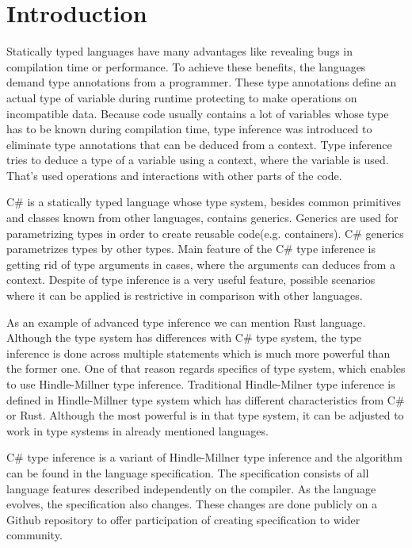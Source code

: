 \chapter*{Introduction}

Statically typed languages have many advantages like revealing bugs in compilation time or performance.
To achieve these benefits, the languages demand type annotations from a programmer.
These type annotations define an actual type of variable during runtime protecting to make operations on incompatible data.
Because code usually contains a lot of variables whose type has to be known during compilation time, type inference was introduced to eliminate type annotations that can be deduced from a context.
Type inference tries to deduce a type of a variable using a context, where the variable is used.
That's used operations and interactions with other parts of the code.


C\# is a statically typed language whose type system, besides common primitives and classes known from other languages, contains generics.
Generics are used for parametrizing types in order to create reusable code(e.g. containers).
C\# generics parametrizes types by other types.
Main feature of the C\# type inference is getting rid of type arguments in cases, where the arguments can deduces from a context.
Despite of type inference is a very useful feature, possible scenarios where it can be applied is restrictive in comparison with other languages.

As an example of advanced type inference we can mention Rust language.
Although the type system has differences with C\# type system, the type inference is done across multiple statements which is much more powerful than the former one.
One of that reason regards specifics of type system, which enables to use Hindle-Millner type inference.
Traditional Hindle-Milner type inference is defined in Hindle-Millner type system which has different characteristics from C\# or Rust.
Although the most powerful is in that type system, it can be adjusted to work in type systems in already mentioned languages.

C\# type inference is a variant of Hindle-Millner type inference and the algorithm can be found in the language specification.
The specification consists of all language features described independently on the compiler.
As the language evolves, the specification also changes.
These changes are done publicly on a Github repository to offer participation of creating specification to wider community.

